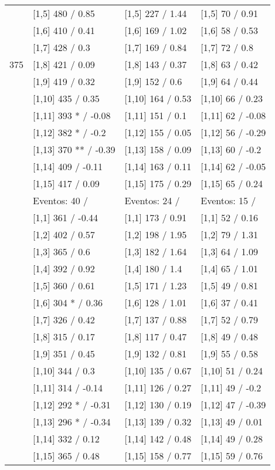\begin{table}
\begin{tabular}[t]{llll}
 & {}[1,5] 480  / 0.85 & {}[1,5] 227  / 1.44 & {}[1,5] 70  / 0.91\\
 & {}[1,6] 410  / 0.41 & {}[1,6] 169  / 1.02 & {}[1,6] 58  / 0.53\\
 & {}[1,7] 428  / 0.3 & {}[1,7] 169  / 0.84 & {}[1,7] 72  / 0.8\\
375 & {}[1,8] 421  / 0.09 & {}[1,8] 143  / 0.37 & {}[1,8] 63  / 0.42\\
\addlinespace
 & {}[1,9] 419  / 0.32 & {}[1,9] 152  / 0.6 & {}[1,9] 64  / 0.44\\
 & {}[1,10] 435  / 0.35 & {}[1,10] 164  / 0.53 & {}[1,10] 66  / 0.23\\
 & {}[1,11] 393 * / -0.08 & {}[1,11] 151  / 0.1 & {}[1,11] 62  / -0.08\\
 & {}[1,12] 382 * / -0.2 & {}[1,12] 155  / 0.05 & {}[1,12] 56  / -0.29\\
 & {}[1,13] 370 ** / -0.39 & {}[1,13] 158  / 0.09 & {}[1,13] 60  / -0.2\\
\addlinespace
 & {}[1,14] 409  / -0.11 & {}[1,14] 163  / 0.11 & {}[1,14] 62  / -0.05\\
 & {}[1,15] 417  / 0.09 & {}[1,15] 175  / 0.29 & {}[1,15] 65  / 0.24\\
 & Eventos:  40 / & Eventos:  24 / & Eventos:  15 /\\
 & {}[1,1] 361  / -0.44 & {}[1,1] 173  / 0.91 & {}[1,1] 52  / 0.16\\
 & {}[1,2] 402  / 0.57 & {}[1,2] 198  / 1.95 & {}[1,2] 79  / 1.31\\
\addlinespace
 & {}[1,3] 365  / 0.6 & {}[1,3] 182  / 1.64 & {}[1,3] 64  / 1.09\\
 & {}[1,4] 392  / 0.92 & {}[1,4] 180  / 1.4 & {}[1,4] 65  / 1.01\\
 & {}[1,5] 360  / 0.61 & {}[1,5] 171  / 1.23 & {}[1,5] 49  / 0.81\\
 & {}[1,6] 304 * / 0.36 & {}[1,6] 128  / 1.01 & {}[1,6] 37  / 0.41\\
 & {}[1,7] 326  / 0.42 & {}[1,7] 137  / 0.88 & {}[1,7] 52  / 0.79\\
\addlinespace
500 & {}[1,8] 315  / 0.17 & {}[1,8] 117  / 0.47 & {}[1,8] 49  / 0.48\\
 & {}[1,9] 351  / 0.45 & {}[1,9] 132  / 0.81 & {}[1,9] 55  / 0.58\\
 & {}[1,10] 344  / 0.3 & {}[1,10] 135  / 0.67 & {}[1,10] 51  / 0.24\\
 & {}[1,11] 314  / -0.14 & {}[1,11] 126  / 0.27 & {}[1,11] 49  / -0.2\\
 & {}[1,12] 292 * / -0.31 & {}[1,12] 130  / 0.19 & {}[1,12] 47  / -0.39\\
\addlinespace
 & {}[1,13] 296 * / -0.34 & {}[1,13] 139  / 0.32 & {}[1,13] 49  / 0.01\\
 & {}[1,14] 332  / 0.12 & {}[1,14] 142  / 0.48 & {}[1,14] 49  / 0.28\\
 & {}[1,15] 365  / 0.48 & {}[1,15] 158  / 0.77 & {}[1,15] 59  / 0.76\\
\bottomrule
\end{tabular}
\end{table}
